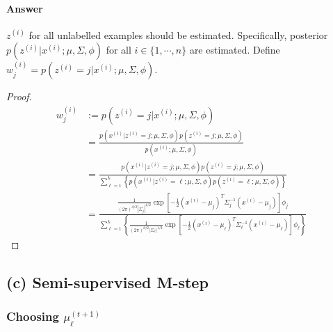 \documentclass[11pt]{article}
\newcommand{\upi}[0]{^{(i)}}
\begin{document}
	\paragraph{Answer} $z\upi$ for all unlabelled examples should be estimated. Specifically, posterior $p(z\upi | x\upi; \mu, \Sigma, \phi)$ for all $i \in \{1,\cdots,n\}$ are estimated. Define $w\upi_j = p(z\upi = j | x\upi; \mu, \Sigma, \phi)$.
	\begin{proof}
		\begin{align}
		w\upi_j &:= p(z\upi = j| x\upi; \mu, \Sigma, \phi) \\
		&= \frac{p(x\upi|z\upi = j; \mu, \Sigma, \phi) p(z\upi = j; \mu, \Sigma, \phi)}{p(x\upi; \mu, \Sigma, \phi)} \\
		&= \frac{p(x\upi|z\upi = j; \mu, \Sigma, \phi) p(z\upi = j; \mu, \Sigma, \phi)}{\sum_{\ell=1}^k \left \{p(x\upi|z\upi = \ell; \mu, \Sigma, \phi) p(z\upi = \ell; \mu, \Sigma, \phi) \right\}} \\
		&= \frac{
		 \frac{1}{(2\pi)^{d/2} |\Sigma_j|^{1/2}} \exp \left[
		 	- \frac{1}{2} (x\upi - \mu_j)^T \Sigma_j^{-1} (x\upi - \mu_j) \right] \phi_j
		}{
		 \sum_{\ell=1}^k \left\{
		 	\frac{1}{(2\pi)^{d/2} |\Sigma_\ell|^{1/2}} \exp \left[
		 	- \frac{1}{2} (x\upi - \mu_\ell)^T \Sigma_\ell^{-1} (x\upi - \mu_\ell)\right] \phi_\ell
		 \right\}
		}
		\end{align}
	\end{proof}
	\newpage
	\subsection{(c) Semi-supervised M-step}
	\subsubsection{Choosing $\mu_\ell^{(t+1)}$}
\end{document}
